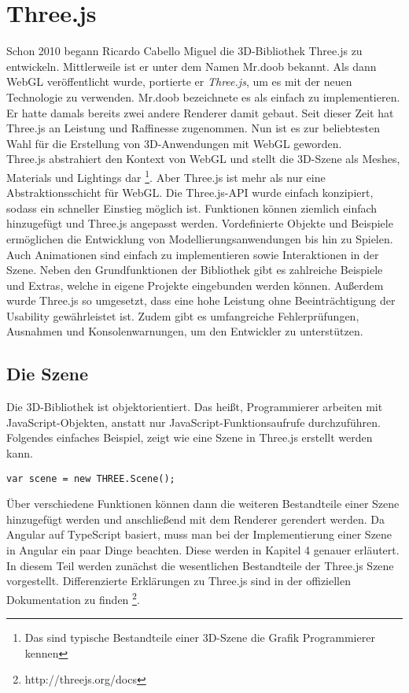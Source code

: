 \section{Three.js}
\label{sec:three.js}
%
Schon 2010 begann Ricardo Cabello Miguel die 3D-Bibliothek Three.js zu entwickeln. Mittlerweile ist er unter dem Namen Mr.doob bekannt. Als dann WebGL veröffentlicht wurde, portierte er \textit{Three.js}, um es mit der neuen Technologie zu verwenden. Mr.doob bezeichnete es als \glqq einfach zu implementieren\grqq. Er hatte damals bereits zwei andere Renderer damit gebaut. Seit dieser Zeit hat Three.js an Leistung und Raffinesse zugenommen. Nun ist es zur beliebtesten Wahl für die Erstellung von 3D-Anwendungen mit WebGL geworden. \\
Three.js abstrahiert den Kontext von WebGL und stellt die 3D-Szene als Meshes, Materials und Lightings dar \footnote{Das sind typische Bestandteile einer 3D-Szene die Grafik Programmierer kennen}. Aber Three.js ist mehr als nur eine Abstraktionsschicht für WebGL. Die Three.js-API wurde einfach konzipiert, sodass ein schneller Einstieg möglich ist. Funktionen können ziemlich einfach hinzugefügt und Three.js angepasst werden. Vordefinierte Objekte und Beispiele ermöglichen die Entwicklung von Modellierungsanwendungen bis hin zu Spielen. Auch Animationen sind einfach zu implementieren sowie Interaktionen in der Szene. Neben den Grundfunktionen der Bibliothek gibt es zahlreiche Beispiele und Extras, welche in eigene Projekte eingebunden werden können. Außerdem wurde Three.js so umgesetzt, dass eine hohe Leistung ohne Beeinträchtigung der Usability gewährleistet ist. Zudem gibt es umfangreiche Fehlerprüfungen, Ausnahmen und Konsolenwarnungen, um den Entwickler zu unterstützen.
%
\subsection{Die Szene}
\label{subsec:scene}
%
Die 3D-Bibliothek ist objektorientiert. Das heißt, Programmierer arbeiten mit JavaScript-Objekten, anstatt nur JavaScript-Funktionsaufrufe durchzuführen. Folgendes einfaches Beispiel, zeigt wie eine Szene in Three.js erstellt werden kann. \\
%
\begin{lstlisting}[caption={Erstellung einer Szene in Three.js},label=lst:addscene]
var scene = new THREE.Scene();
\end{lstlisting}
%
Über verschiedene Funktionen können dann die weiteren Bestandteile einer Szene hinzugefügt werden und anschließend mit dem Renderer gerendert werden. Da Angular auf TypeScript basiert, muss man bei der Implementierung einer Szene in Angular ein paar Dinge beachten. Diese werden in Kapitel 4 genauer erläutert. In diesem Teil werden zunächst die wesentlichen Bestandteile der Three.js Szene vorgestellt. Differenzierte Erklärungen zu Three.js sind in der offiziellen Dokumentation zu finden \footnote{http://threejs.org/docs}.
%
